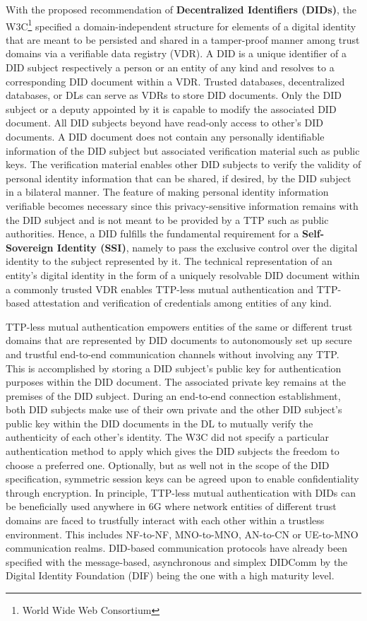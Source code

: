 \documentclass[conference]{IEEEtran}
\begin{document}
With the proposed recommendation of {\bf{Decentralized Identifiers (DIDs)}}, the W3C\footnote{World Wide Web Consortium} specified a domain-independent structure for elements of a digital identity that are meant to be persisted and shared in a tamper-proof manner among trust domains via a verifiable data registry (VDR). A DID is a unique identifier of a DID subject respectively a person or an entity of any kind and resolves to a corresponding DID document within a VDR. Trusted databases, decentralized databases, or DLs can serve as VDRs to store DID documents.  Only the DID subject or a deputy appointed by it is capable to modify the associated DID document. All DID subjects beyond have read-only access to other's DID documents. A DID document does not contain any personally identifiable information of the DID subject but associated verification material such as public keys. The verification material enables other DID subjects to verify the validity of personal identity information that can be shared, if desired, by the DID subject in a bilateral manner. The feature of making personal identity information verifiable becomes necessary since this privacy-sensitive information remains with the DID subject and is not meant to be provided by a TTP such as public authorities. Hence, a DID fulfills the fundamental requirement for a {\bf{Self-Sovereign Identity (SSI)}}, namely to pass the exclusive control over the digital identity to the subject represented by it. The technical representation of an entity's digital identity in the form of a uniquely resolvable DID document within a commonly trusted VDR enables TTP-less mutual authentication and TTP-based attestation and verification of credentials among entities of any kind. 

TTP-less mutual authentication empowers entities of the same or different trust domains that are represented by DID documents to autonomously set up secure and trustful end-to-end communication channels without involving any TTP. This is accomplished by storing a DID subject's public key for authentication purposes within the DID document. The associated private key remains at the premises of the DID subject. During an end-to-end connection establishment, both DID subjects make use of their own private and the other DID subject's public key within the DID documents in the DL to mutually verify the authenticity of each other's identity. The W3C did not specify a particular authentication method to apply which gives the DID subjects the freedom to choose a preferred one. Optionally, but as well not in the scope of the DID specification, symmetric session keys can be agreed upon to enable confidentiality through encryption. In principle, TTP-less mutual authentication with DIDs can be beneficially used anywhere in 6G where network entities of different trust domains are faced to trustfully interact with each other within a trustless environment. This includes NF-to-NF, MNO-to-MNO, AN-to-CN or UE-to-MNO communication realms. DID-based communication protocols have already been specified with the message-based, asynchronous and simplex DIDComm \cite{DecentralizedIdentityFoundation.24.01.2022} by the Digital Identity Foundation (DIF) being the one with a high maturity level.       
\end{document}
